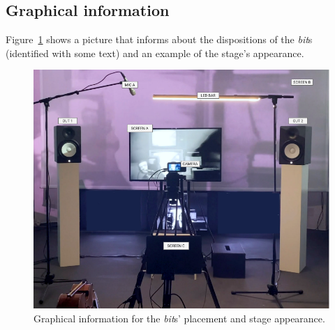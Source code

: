 \subsection*{Graphical information}
Figure~\ref{fig:aa-mapping-graphical} shows a picture that informs about the dispositions of the \textit{bit}s (identified with some text) and an example of the stage's appearance.

\begin{figure}[!h]
    \centering
    \includegraphics[width=\linewidth]{chapters/appendix/a/image/grapha-data-graphic.png}
    \caption{Graphical information for the \textit{bit}s’ placement and stage appearance.}
    \label{fig:aa-mapping-graphical}
\end{figure}

